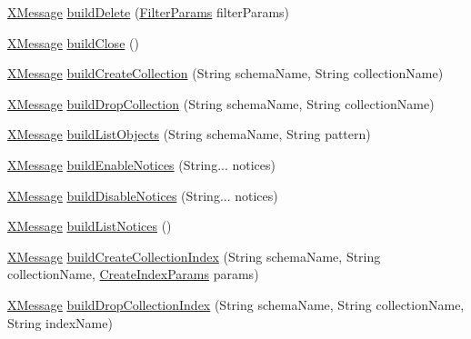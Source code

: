 \begin{DoxyCompactItemize}
\item 
\mbox{\hyperlink{classcom_1_1mysql_1_1cj_1_1protocol_1_1x_1_1_x_message}{X\+Message}} \mbox{\hyperlink{classcom_1_1mysql_1_1cj_1_1protocol_1_1x_1_1_x_message_builder_a15cf6f85f675dae1f0405b5c0d800ee1}{build\+Delete}} (\mbox{\hyperlink{classcom_1_1mysql_1_1cj_1_1xdevapi_1_1_filter_params}{Filter\+Params}} filter\+Params)
\item 
\mbox{\hyperlink{classcom_1_1mysql_1_1cj_1_1protocol_1_1x_1_1_x_message}{X\+Message}} \mbox{\hyperlink{classcom_1_1mysql_1_1cj_1_1protocol_1_1x_1_1_x_message_builder_af62045f3c8ab379984af2dc1dbc19059}{build\+Close}} ()
\item 
\mbox{\hyperlink{classcom_1_1mysql_1_1cj_1_1protocol_1_1x_1_1_x_message}{X\+Message}} \mbox{\hyperlink{classcom_1_1mysql_1_1cj_1_1protocol_1_1x_1_1_x_message_builder_a4a96b13e3499668ebb6321cd9e7a25ea}{build\+Create\+Collection}} (String schema\+Name, String collection\+Name)
\item 
\mbox{\hyperlink{classcom_1_1mysql_1_1cj_1_1protocol_1_1x_1_1_x_message}{X\+Message}} \mbox{\hyperlink{classcom_1_1mysql_1_1cj_1_1protocol_1_1x_1_1_x_message_builder_ae29a2e6af7f8d764d772e61f86bfcf06}{build\+Drop\+Collection}} (String schema\+Name, String collection\+Name)
\item 
\mbox{\hyperlink{classcom_1_1mysql_1_1cj_1_1protocol_1_1x_1_1_x_message}{X\+Message}} \mbox{\hyperlink{classcom_1_1mysql_1_1cj_1_1protocol_1_1x_1_1_x_message_builder_a961f7a690c9c3f57eddf39e332f6871d}{build\+List\+Objects}} (String schema\+Name, String pattern)
\item 
\mbox{\hyperlink{classcom_1_1mysql_1_1cj_1_1protocol_1_1x_1_1_x_message}{X\+Message}} \mbox{\hyperlink{classcom_1_1mysql_1_1cj_1_1protocol_1_1x_1_1_x_message_builder_a2b92f5fdc863a45a9fcd2a1855f2de9d}{build\+Enable\+Notices}} (String... notices)
\item 
\mbox{\hyperlink{classcom_1_1mysql_1_1cj_1_1protocol_1_1x_1_1_x_message}{X\+Message}} \mbox{\hyperlink{classcom_1_1mysql_1_1cj_1_1protocol_1_1x_1_1_x_message_builder_ae47857a6385f7d0647d87266250f5a33}{build\+Disable\+Notices}} (String... notices)
\item 
\mbox{\hyperlink{classcom_1_1mysql_1_1cj_1_1protocol_1_1x_1_1_x_message}{X\+Message}} \mbox{\hyperlink{classcom_1_1mysql_1_1cj_1_1protocol_1_1x_1_1_x_message_builder_aa5a1aea26a2067395d8fc8c37598dfea}{build\+List\+Notices}} ()
\item 
\mbox{\hyperlink{classcom_1_1mysql_1_1cj_1_1protocol_1_1x_1_1_x_message}{X\+Message}} \mbox{\hyperlink{classcom_1_1mysql_1_1cj_1_1protocol_1_1x_1_1_x_message_builder_a2c975ab1cc6f224fdba48917fa073826}{build\+Create\+Collection\+Index}} (String schema\+Name, String collection\+Name, \mbox{\hyperlink{classcom_1_1mysql_1_1cj_1_1xdevapi_1_1_create_index_params}{Create\+Index\+Params}} params)
\item 
\mbox{\hyperlink{classcom_1_1mysql_1_1cj_1_1protocol_1_1x_1_1_x_message}{X\+Message}} \mbox{\hyperlink{classcom_1_1mysql_1_1cj_1_1protocol_1_1x_1_1_x_message_builder_ae1efcf214920ddfa0d3dff1cadc4e423}{build\+Drop\+Collection\+Index}} (String schema\+Name, String collection\+Name, String index\+Name)
\end{DoxyCompactItemize}
